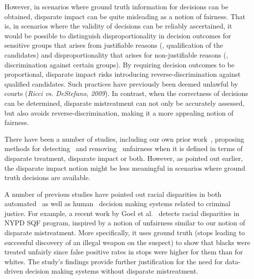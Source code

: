 \documentclass[letterpaper]{sig-alternate-2013}
\newcommand{\xhdr}[1]{\vspace{0.5mm}\noindent{{\bf #1.}}}
\newcommand{\disc}{disparate mistreatment}
\begin{document}
However, in  scenarios where ground truth information for decisions can be obtained, disparate impact
can be quite misleading as a notion of fairness. That is, in scenarios where the validity of decisions can be reliably
ascertained, it would be possible to distinguish disproportionality in decision outcomes for sensitive groups that
arises from justifiable reasons (\eg, qualification of the candidates) and disproportionality that arises for
non-justifiable reasons (\ie, discrimination against certain groups).
By requiring decision outcomes to be proportional, disparate impact risks introducing reverse-discrimination
against quali\-fied candidates. Such practices have previously been deemed unlawful by courts (\textit{Ricci vs. DeStefano, 2009}).
In contrast, when the correctness of decisions can be determined, disparate mistreatment can not only be
accurately assessed, but also avoids reverse-discrimination, making it a more appealing notion of fairness.
























\vspace{1.5mm}
\xhdr{Related Work}
There have been a number of studies, including our own prior work~\cite{zafar_fairness}, proposing methods for
detecting~\cite{feldman_kdd15,salvatore_knn,pedreschi_discrimination,salvatore_survey}
and removing~\cite{Dwork2012,feldman_kdd15,goh_nips2016,kamiran_sampling,kamishima_regularizer,pedreschi_discrimination,zafar_fairness,icml2013_zemel13}
unfairness when it is defined in terms of disparate treatment, disparate impact or both.
However, as pointed out earlier, the disparate impact notion might be less
meaningful in scenarios where ground truth decisions are available.


A number of previous studies have pointed out racial disparities in both automated~\cite{propublica_story}
as well as human~\cite{goel_frisk,fdr_benchmarking} decision making systems related to criminal justice.
For example, a recent work by Goel et al.~\cite{goel_frisk} detects racial disparities in NYPD SQF
program, inspired by a notion of unfairness similar to our notion of disparate
mistreatment.
More specifically, it uses
ground truth (stops leading to successful discovery of an illegal weapon on the
suspect) to show that blacks were treated unfairly since false
positive rates in stops were higher for them than for whites.
The study's findings provide further justification for the need for
data-driven decision making systems without \disc{}.
\end{document}
